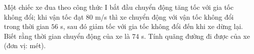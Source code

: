 \begin{ex}
Một chiếc xe đua theo công thức I bắt đầu chuyển động tăng tốc với gia tốc không đổi; khi vận tốc đạt $80$ m/s thì xe chuyển động với vận tốc không đổi trong thời gian $56$ s, sau đó giảm tốc với gia tốc không đổi đến khi xe dừng lại. Biết rằng thời gian chuyển động của xe là $74$ s. Tính quãng đường đi được của xe (đơn vị: mét).
\end{ex}
